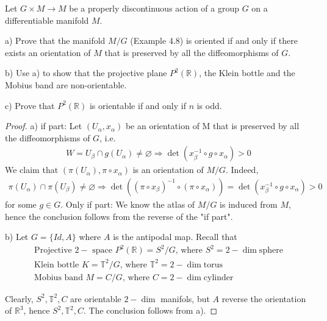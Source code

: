 \begin{Exercise}[][Exer 9.]
    Let $G \times M \rightarrow M$ be a properly discontinuous action of a group $G$ on a differentiable manifold $M$.

a) Prove that the manifold $M / G$ (Example 4.8) is oriented if and only if there exists an orientation of $M$ that is preserved by all the diffeomorphisms of $G$.

b) Use a) to show that the projective plane $P^2(\mathbb{R})$, the Klein bottle and the Mobius band are non-orientable.

c) Prove that $P^2(\mathbb{R})$ is orientable if and only if $n$ is odd.
\end{Exercise}
\begin{proof}
 a) if part: Let $\left(U_\alpha, x_\alpha\right)$ be an orientation of $\mathrm{M}$ that is preserved by all the diffeomorphisms of $G$, i.e.
\begin{align*}
W=U_\beta \cap g\left(U_\alpha\right) \neq \varnothing \Rightarrow \operatorname{det}\left(x_\beta^{-1} \circ g \circ x_\alpha\right)>0
\end{align*}
We claim that $\left(\pi\left(U_\alpha\right), \pi \circ x_\alpha\right)$ is an orientation of $M / G$. Indeed,
\begin{align*}
\pi\left(U_\alpha\right) \cap \pi\left(U_\beta\right) \neq \varnothing \Rightarrow \operatorname{det}\left(\left(\pi \circ x_\beta\right)^{-1} \circ\left(\pi \circ x_\alpha\right)\right)=\operatorname{det}\left(x_\beta^{-1} \circ g \circ x_\alpha\right)>0
\end{align*}
for some $g \in G$.
Only if part: We know the atlas of $M / G$ is induced from $M$, hence the conclusion follows from the reverse of the "if part".

b) Let $G=\{I d, A\}$ where $A$ is the antipodal map. Recall that
\begin{align*}
    \text{Projective $2-$ space $P^2(\mathbb{R})=S^2 / G$, where $S^2$} =2-\operatorname{dim} \text{sphere}\\
\text{Klein bottle $K=\mathbb{T}^2 / G$, where $\mathbb{T}^2$}=2-\operatorname{dim} \text{torus}\\
\text{Mobius band $M=C / G$, where $C$}=2-\operatorname{dim} \text{cylinder}
\end{align*}


Clearly, $S^2, \mathbb{T}^2, C$ are orientable $2-\operatorname{dim}$ manifols, but $A$ reverse the orientation of $\mathbb{R}^3$, hence $S^2, \mathbb{T}^2, C$. The conclusion follows from a).


\end{proof}
